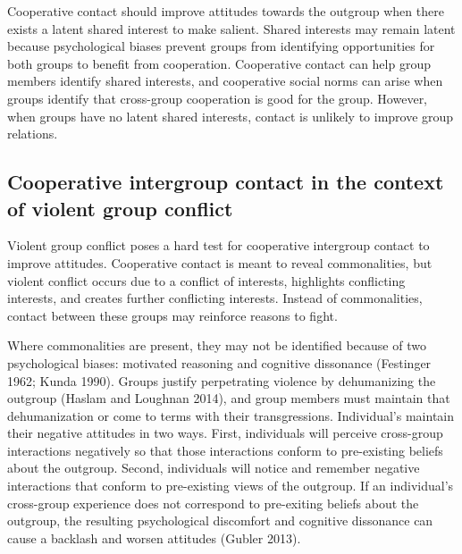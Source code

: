 \documentclass[11pt]{article}
\begin{document}
Cooperative contact should improve attitudes towards the outgroup when
there exists a latent shared interest to make salient. Shared interests
may remain latent because psychological biases prevent groups from
identifying opportunities for both groups to benefit from cooperation.
Cooperative contact can help group members identify shared interests,
and cooperative social norms can arise when groups identify that
cross-group cooperation is good for the group. However, when groups have
no latent shared interests, contact is unlikely to improve group
relations.

\hypertarget{cooperative-intergroup-contact-in-the-context-of-violent-group-conflict}{%
\subsection{Cooperative intergroup contact in the context of violent
group
conflict}\label{cooperative-intergroup-contact-in-the-context-of-violent-group-conflict}}

Violent group conflict poses a hard test for cooperative intergroup
contact to improve attitudes. Cooperative contact is meant to reveal
commonalities, but violent conflict occurs due to a conflict of
interests, highlights conflicting interests, and creates further
conflicting interests. Instead of commonalities, contact between these
groups may reinforce reasons to fight.

Where commonalities are present, they may not be identified because of
two psychological biases: motivated reasoning and cognitive dissonance
(Festinger 1962; Kunda 1990). Groups justify perpetrating violence by
dehumanizing the outgroup (Haslam and Loughnan 2014), and group members
must maintain that dehumanization or come to terms with their
transgressions. Individual's maintain their negative attitudes in two
ways. First, individuals will perceive cross-group interactions
negatively so that those interactions conform to pre-existing beliefs
about the outgroup. Second, individuals will notice and remember
negative interactions that conform to pre-existing views of the
outgroup. If an individual's cross-group experience does not correspond
to pre-exiting beliefs about the outgroup, the resulting psychological
discomfort and cognitive dissonance can cause a backlash and worsen
attitudes (Gubler 2013).
\end{document}
